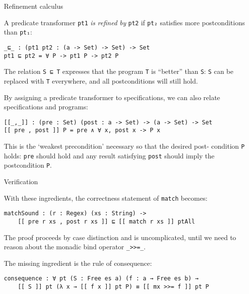 \documentclass{beamer}
\newcommand{\Agda}[1]{\texttt{\footnotesize #1}\xspace}
\newcommand{\match}{\Agda{match}}
\begin{document}
\begin{frame}[fragile]{Refinement calculus}

A predicate transformer \Agda{pt1} \emph{is refined by} \Agda{pt2} if \Agda{pt₂} satisfies more postconditions than \Agda{pt₁}:
\vspace{-\baselineskip}
\begin{verbatim}
_⊑_ : (pt1 pt2 : (a -> Set) -> Set) -> Set
pt1 ⊑ pt2 = ∀ P -> pt1 P -> pt2 P
\end{verbatim}

The relation \Agda{S ⊑ T} expresses that the program \Agda{T} is ``better'' than \Agda{S}:
\Agda{S} can be replaced with \Agda{T} everywhere, and all postconditions will still hold.

\vspace{\baselineskip}


By assigning a predicate transformer to specifications, we can also relate specifications and programs:
\vspace{-\baselineskip}
\begin{verbatim}
[[_,_]] : (pre : Set) (post : a -> Set) -> (a -> Set) -> Set
[[ pre , post ]] P = pre ∧ ∀ x, post x -> P x
\end{verbatim}

This is the `weakest precondition' necessary so that the desired post- condition \Agda{P} holds:
\Agda{pre} should hold and any result satisfying \Agda{post} should imply the postcondition \Agda{P}.

\end{frame}

\begin{frame}[fragile]{Verification}

With these ingredients, the correctness statement of \match becomes:
\begin{verbatim}
matchSound : (r : Regex) (xs : String) ->
    [[ pre r xs , post r xs ]] ⊑ [[ match r xs ]] ptAll
\end{verbatim}

The proof proceeds by case distinction and is uncomplicated, until we need to reason about the monadic bind operator \Agda{\_>>=\_}.

\pause

The missing ingredient is the rule of consequence:
\begin{verbatim}
consequence : ∀ pt (S : Free es a) (f : a → Free es b) →
    [[ S ]] pt (λ x → [[ f x ]] pt P) ≡ [[ mx >>= f ]] pt P
\end{verbatim}

\end{frame}
\end{document}
